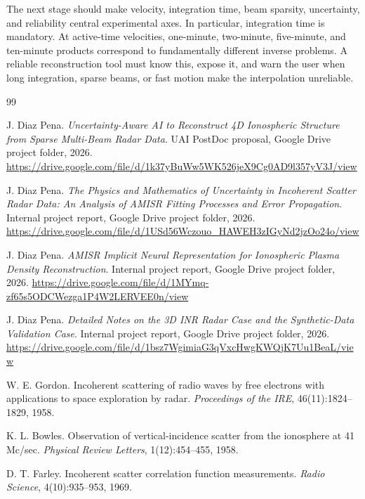 \documentclass[11pt]{article}
\begin{document}
The next stage should make velocity, integration time, beam sparsity, uncertainty, and reliability
central experimental axes. In particular, integration time is mandatory. At active-time velocities,
one-minute, two-minute, five-minute, and ten-minute products correspond to fundamentally
different inverse problems. A reliable reconstruction tool must know this, expose it, and warn the
user when long integration, sparse beams, or fast motion make the interpolation unreliable.

\begin{thebibliography}{99}

J. Diaz Pena.
\newblock \emph{Uncertainty-Aware AI to Reconstruct 4D Ionospheric Structure from Sparse Multi-Beam Radar Data}.
\newblock UAI PostDoc proposal, Google Drive project folder, 2026.
\newblock \url{https://drive.google.com/file/d/1k37yBuWw5WK526jeX9Cg0AD9l357yV3J/view}

J. Diaz Pena.
\newblock \emph{The Physics and Mathematics of Uncertainty in Incoherent Scatter Radar Data: An Analysis of AMISR Fitting Processes and Error Propagation}.
\newblock Internal project report, Google Drive project folder, 2026.
\newblock \url{https://drive.google.com/file/d/1USd56Wczouo_HAWEH3zIGyNd2jzOo24o/view}

J. Diaz Pena.
\newblock \emph{AMISR Implicit Neural Representation for Ionospheric Plasma Density Reconstruction}.
\newblock Internal project report, Google Drive project folder, 2026.
\newblock \url{https://drive.google.com/file/d/1MYmq-zf65s5ODCWezga1P4W2LERVEE0n/view}

J. Diaz Pena.
\newblock \emph{Detailed Notes on the 3D INR Radar Case and the Synthetic-Data Validation Case}.
\newblock Internal project report, Google Drive project folder, 2026.
\newblock \url{https://drive.google.com/file/d/1bsz7WgimiaG3qVxcHwgKWQjK7Uu1BeaL/view}

W. E. Gordon.
\newblock Incoherent scattering of radio waves by free electrons with applications to space exploration by radar.
\newblock \emph{Proceedings of the IRE}, 46(11):1824--1829, 1958.

K. L. Bowles.
\newblock Observation of vertical-incidence scatter from the ionosphere at 41 Mc/sec.
\newblock \emph{Physical Review Letters}, 1(12):454--455, 1958.

D. T. Farley.
\newblock Incoherent scatter correlation function measurements.
\newblock \emph{Radio Science}, 4(10):935--953, 1969.


\end{thebibliography}
\end{document}
